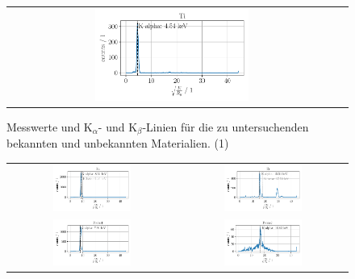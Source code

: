 \documentclass[ngerman]{scrartcl}
\begin{document}
\begin{figure}[H]
\begin{tabular}{cc}
        \includegraphics[width=0.48\textwidth]{../plots/roentgen_data_6.pdf}   \\
    \end{tabular}
    \caption[Messwerte unbekannter Proben (1)]{Messwerte und K$_{\alpha}$- und K$_{\beta}$-Linien für die zu untersuchenden bekannten und unbekannten Materialien. (1)}
    \label{fig:roentgenfluoreszenz1}
\end{figure}
%
\begin{figure}[H]
    \centering
    \begin{tabular}{cc}
        \includegraphics[width=0.48\textwidth]{../plots/roentgen_data_7.pdf}  &
        \includegraphics[width=0.48\textwidth]{../plots/roentgen_data_8.pdf}    \\
        \includegraphics[width=0.48\textwidth]{../plots/roentgen_data_9.pdf}  &
        \includegraphics[width=0.48\textwidth]{../plots/roentgen_data_10.pdf}   \\

\end{tabular}
\end{figure}
\end{document}
